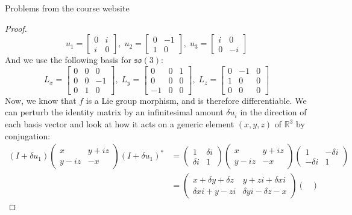 \documentclass[12pt]{article}
\newcommand{\R}{\mathbb{R}}
\theoremstyle{definition}
\begin{document}
\begin{section}{Problems from the course website}
\begin{proof}
	\[u_1 = \begin{bmatrix}
		0 & i \\ i & 0
	\end{bmatrix}, \; u_2 = \begin{bmatrix}
	0 & -1 \\1 & 0	
\end{bmatrix}, \; u_3 = \begin{bmatrix}
i & 0 \\0 & -i
\end{bmatrix}\]
And we use the following basis for $\mathfrak{so}(3)$:
\[L_x = \begin{bmatrix}
	0 & 0 & 0 \\ 0 & 0 & -1 \\0 & 1 & 0
\end{bmatrix}, \; L_y = \begin{bmatrix}
	0 & 0 & 1 \\ 0 & 0 & 0 \\-1 & 0 & 0
\end{bmatrix}, \; L_z = \begin{bmatrix}
0 & -1 & 0 \\ 1 & 0 & 0 \\ 0 & 0 &0
\end{bmatrix}\]
Now, we know that $f$ is a Lie group morphism, and is therefore differentiable. We can perturb the identity matrix by an infinitesimal amount $\delta u_i$ in the direction of each basis vector and look at how it acts on a generic element $(x,y,z)$ of $\R^3$ by conjugation:
\begin{align*}
	(I + \delta u_1)\begin{pmatrix}
		x & y + iz \\y-iz & -x	
	\end{pmatrix}(I+\delta u_1)^*
	&= \begin{pmatrix}
		1 & \delta i\\ \delta i & 1
	\end{pmatrix} \begin{pmatrix}
		x & y + iz \\y-iz & -x	
	\end{pmatrix} \begin{pmatrix}
		1 & -\delta i\\ -\delta i & 1
	\end{pmatrix}\\
	&= \begin{pmatrix}x + \delta y + \delta z & y + zi + \delta xi\\
	\delta xi + y - zi & \delta yi - \delta z - x \end{pmatrix}\begin{pmatrix}

\end{pmatrix}
\end{align*}
\end{proof}
\end{section}
\end{document}
